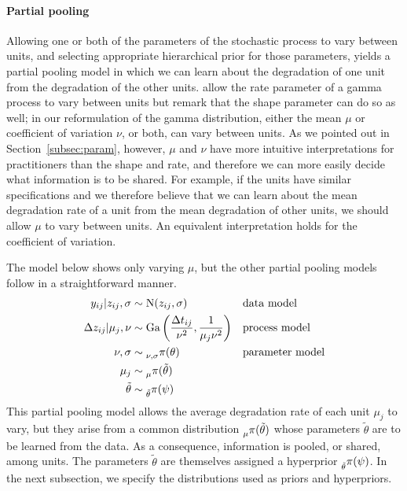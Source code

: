 \documentclass{article}
\begin{document}
\paragraph{Partial pooling} Allowing one or both of the parameters of the stochastic process to vary between units, and selecting appropriate hierarchical prior for those parameters, yields a partial pooling model in which we can learn about the degradation of one unit from the degradation of the other units. \citet{lawless_covariates_2004} allow the rate parameter of a gamma process to vary between units but remark that the shape parameter can do so as well; in our reformulation of the gamma distribution, either the mean $\mu$ or coefficient of variation $\nu$, or both, can vary between units. As we pointed out in Section~\ref{subsec:param}, however, $\mu$ and $\nu$ have more intuitive interpretations for practitioners than the shape and rate, and therefore we can more easily decide what information is to be shared. For example, if the units have similar specifications and we therefore believe that we can learn about the mean degradation rate of a unit from the mean degradation of other units, we should allow $\mu$ to vary between units. An equivalent interpretation holds for the coefficient of variation. 

The model below shows only varying $\mu$, but the other partial pooling models follow in a straightforward manner. 
\begin{align*} 
    y_{ij}|z_{ij}, \sigma & \sim \mbox{N}(z_{ij}, \sigma)  && \mbox{data model} \\
    \Delta z_{ij}|\mu_j, \nu & \sim \mbox{Ga} \left( \frac{\Delta t_{ij}}{\nu^2}, \frac{1}{\mu_j \nu^2} \right) && \mbox{process model} \\
    \nu, \sigma & \sim \prescript{}{\nu,\sigma}{\pi}(\theta) && \mbox{parameter model}  \\
    \mu_j & \sim \prescript{}{\mu}{\pi}(\tilde{\theta}) \\
    \tilde{\theta} & \sim \prescript{}{\tilde{\theta}}{\pi}(\psi)
\end{align*}
This partial pooling model allows the average degradation rate of each unit $\mu_j$ to vary, but they arise from a common distribution $\prescript{}{\mu}{\pi}(\tilde{\theta})$ whose parameters $\tilde{\theta}$ are to be learned from the data. As a consequence, information is pooled, or shared, among units. The parameters $\tilde{\theta}$ are themselves assigned a hyperprior $\prescript{}{\tilde{\theta}}{\pi}(\psi)$. In the next subsection, we specify the distributions used as priors and hyperpriors.
\end{document}

